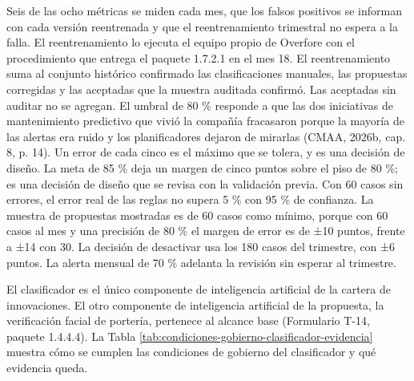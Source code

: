 \documentclass[anexo]{../../comun/overfore}
\begin{document}
Seis de las ocho métricas se miden cada mes, que los falsos positivos se informan con cada versión reentrenada y que el reentrenamiento trimestral no espera a la falla. El reentrenamiento lo ejecuta el equipo propio de Overfore con el procedimiento que entrega el paquete 1.7.2.1 en el mes 18. El reentrenamiento suma al conjunto histórico confirmado las clasificaciones manuales, las propuestas corregidas y las aceptadas que la muestra auditada confirmó. Las aceptadas sin auditar no se agregan. El umbral de 80 \% responde a que las dos iniciativas de mantenimiento predictivo que vivió la compañía fracasaron porque la mayoría de las alertas era ruido y los planificadores dejaron de mirarlas (CMAA, 2026b, cap. 8, p. 14). Un error de cada cinco es el máximo que se tolera, y es una decisión de diseño. La meta de 85 \% deja un margen de cinco puntos sobre el piso de 80 \%; es una decisión de diseño que se revisa con la validación previa. Con 60 casos sin errores, el error real de las reglas no supera 5 \% con 95 \% de confianza. La muestra de propuestas mostradas es de 60 casos como mínimo, porque con 60 casos al mes y una precisión de 80 \% el margen de error es de ±10 puntos, frente a ±14 con 30. La decisión de desactivar usa los 180 casos del trimestre, con ±6 puntos. La alerta mensual de 70 \% adelanta la revisión sin esperar al trimestre.

El clasificador es el único componente de inteligencia artificial de la cartera de innovaciones. El otro componente de inteligencia artificial de la propuesta, la verificación facial de portería, pertenece al alcance base (Formulario T-14, paquete 1.4.4.4). La Tabla \ref{tab:condiciones-gobierno-clasificador-evidencia} muestra cómo se cumplen las condiciones de gobierno del clasificador y qué evidencia queda.
\end{document}
